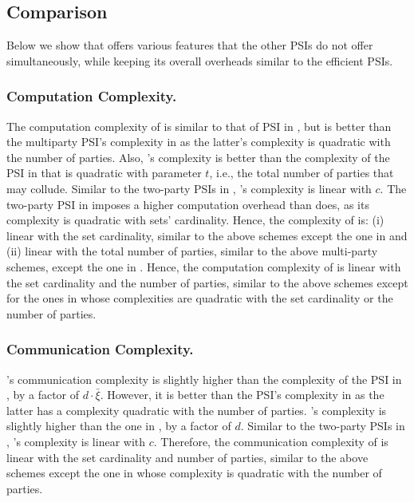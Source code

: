 \vs


\subsection{Comparison}



Below we show that \epsi offers various features that the other PSIs do not offer simultaneously, while keeping its overall overheads similar to the efficient PSIs.  

\vs


\subsubsection{Computation Complexity.} The  computation complexity  of \epsi is similar to that of PSI in \cite{AbadiDMT22}, but is better than the multiparty PSI's complexity in \cite{DBLP:conf/ccs/KolesnikovMPRT17} as  the latter's complexity is quadratic with the number of parties. Also, \epsi's complexity  is better than the complexity of the PSI in  \cite{NevoTY21}  that is quadratic with parameter $t$, i.e., the total number of parties that may collude. Similar to the two-party PSIs in \cite{DebnathD16,RaghuramanR22}, \epsi's complexity is linear with $c$.  The two-party PSI in \cite{DBLP:conf/dbsec/DongCCR13} imposes a higher computation overhead than \epsi does, as its complexity is quadratic with sets' cardinality. Hence, the complexity of \epsi is: (i) linear with the set cardinality, similar to the above schemes except the one in \cite{DBLP:conf/dbsec/DongCCR13} and (ii) linear with the total number of parties, similar to  the above multi-party schemes, except the one in \cite{DBLP:conf/ccs/KolesnikovMPRT17}. 
%
Hence, the computation complexity of \epsi is linear with the set cardinality and the number of parties, similar to the above schemes except for the ones in \cite{DBLP:conf/ccs/KolesnikovMPRT17,DBLP:conf/dbsec/DongCCR13} whose complexities are quadratic with the set cardinality or the number of parties. 

\vs
\vs


\subsubsection{Communication Complexity.}  \epsi's communication complexity is slightly higher than the complexity of the PSI in \cite{AbadiDMT22}, by a factor of $d\cdot \bar\xi$. However, it is better than the  PSI's complexity in \cite{DBLP:conf/ccs/KolesnikovMPRT17} as the latter has a complexity quadratic with the number of parties. \epsi's complexity is slightly higher than the one in \cite{NevoTY21}, by a factor of $d$. Similar to the two-party PSIs in  \cite{DebnathD16,RaghuramanR22,DBLP:conf/dbsec/DongCCR13}, \epsi's complexity is linear with $c$. 
%
Therefore, the communication complexity of \epsi is linear with the set cardinality and number of parties, similar to the above schemes except the one in \cite{DBLP:conf/ccs/KolesnikovMPRT17} whose complexity is quadratic with the number of parties. 

